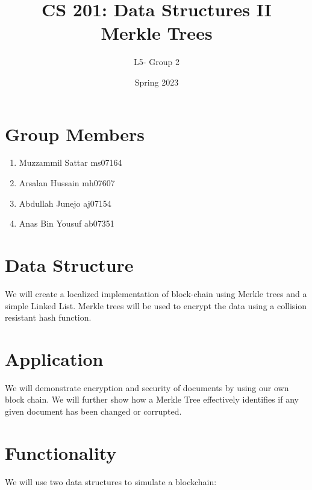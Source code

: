 \documentclass{article}
\title {CS 201: Data Structures II \\Merkle Trees} %
\author{L5- Group 2} %
\date{Spring 2023}
\begin{document}
\maketitle
\section{Group Members}
\begin{enumerate}
  \item Muzzammil Sattar ms07164
  \item Arsalan Hussain mh07607
  \item Abdullah Junejo aj07154
  \item Anas Bin Yousuf ab07351
\end{enumerate}
\section{Data Structure}
We will create a localized implementation of block-chain using Merkle trees and a simple Linked List. 
Merkle trees will be used to encrypt the data using a collision resistant hash function. 
\section{Application}
We will demonstrate encryption and security of documents by using our own block chain. We will further show how a Merkle Tree effectively identifies if any given document has been changed or corrupted.  
\section{Functionality}
We will use two data structures to simulate a blockchain:
\end{document}
